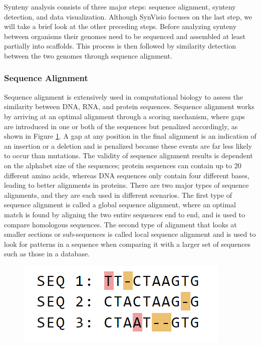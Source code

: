 Synteny analysis consists of three major steps: sequence alignment, synteny detection, and data visualization. Although SynVisio focuses on the last step, we will take a brief look at the other preceding steps. Before analyzing synteny between organisms their genomes need to be sequenced and assembled at least partially into scaffolds. This process is then followed by similarity detection between the two genomes through sequence alignment.



\subsubsection{Sequence Alignment}
Sequence alignment is extensively used in computational biology to assess the similarity between DNA, RNA, and protein sequences. Sequence alignment works by arriving at an optimal alignment through a scoring mechanism, where gaps are introduced in one or both of the sequences but penalized accordingly, as shown in Figure \ref{fig:ch_2_sequence_alignment_multi}. A gap at any position in the final alignment is an indication of an insertion or a deletion and is penalized because these events are far less likely to occur than mutations. The validity of sequence alignment results is dependent on the alphabet size of the sequences; protein sequences can contain up to 20 different amino acids, whereas DNA sequences only contain four different bases, leading to better alignments in proteins. There are two major types of sequence alignments, and they are each used in different scenarios. The first type of sequence alignment is called a global sequence alignment, where an optimal match is found by aligning the two entire sequences end to end, and is used to compare homologous sequences. The second type of alignment that looks at smaller sections or sub-sequences is called local sequence alignment and is used to look for patterns in a sequence when comparing it with a larger set of sequences such as those in a database. 

\begin{figure}
  \centering
  \includegraphics[width=.45\linewidth]{images/ch_2_sequence_alignment_multi.PNG}
  \label{fig:ch_2_sequence_alignment_multi}
\end{figure}


